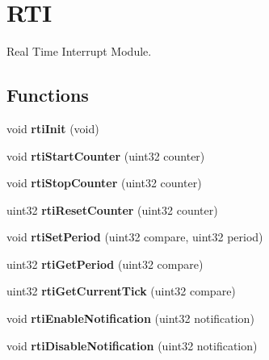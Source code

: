 \hypertarget{group__RTI}{}\section{R\+TI}
\label{group__RTI}


Real Time Interrupt Module.  


\subsection*{Functions}
\begin{DoxyCompactItemize}
\item 
\mbox{\label{group__RTI_ga2ab125f7a976afe88811407a39ea1c28}} 
void {\bfseries rti\+Init} (void)
\item 
\mbox{\label{group__RTI_ga63a9d423e889e4be4dcda5856974ab03}} 
void {\bfseries rti\+Start\+Counter} (uint32 counter)
\item 
\mbox{\label{group__RTI_gafb1297e071d25cf401b1590487bce097}} 
void {\bfseries rti\+Stop\+Counter} (uint32 counter)
\item 
\mbox{\label{group__RTI_ga3f5dba3038d17156658db9a648eb2425}} 
uint32 {\bfseries rti\+Reset\+Counter} (uint32 counter)
\item 
\mbox{\label{group__RTI_ga68be9dfa7c820e7ccb3c4e059288d371}} 
void {\bfseries rti\+Set\+Period} (uint32 compare, uint32 period)
\item 
\mbox{\label{group__RTI_ga33763f05be8311dc9ee88a8a6099dbeb}} 
uint32 {\bfseries rti\+Get\+Period} (uint32 compare)
\item 
\mbox{\label{group__RTI_gaacf32f218cb795601b6a0c8e36a1aaa4}} 
uint32 {\bfseries rti\+Get\+Current\+Tick} (uint32 compare)
\item 
\mbox{\label{group__RTI_ga049b10a8828d1d06e900beba6359fed8}} 
void {\bfseries rti\+Enable\+Notification} (uint32 notification)
\item 
\mbox{\label{group__RTI_gab2415e212403ef711e6804bbf0ffb3b0}} 
void {\bfseries rti\+Disable\+Notification} (uint32 notification)

\end{DoxyCompactItemize}
